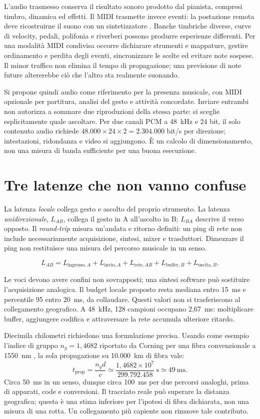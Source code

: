L'audio trasmesso conserva il risultato sonoro prodotto dal pianista,
compresi timbro, dinamica ed effetti. Il MIDI trasmette invece eventi:
la postazione remota deve ricostruirne il suono con un sintetizzatore
\cite{eng_midi}. Banche timbriche diverse, curve di velocity, pedali,
polifonia e riverberi possono produrre esperienze differenti. Per una
modalità MIDI condivisa occorre dichiarare strumenti e mappature,
gestire ordinamento e perdita degli eventi, sincronizzare le scelte
ed evitare note sospese. Il minor traffico non elimina il tempo di
propagazione; una previsione di note future altererebbe ciò che
l'altro sta realmente suonando.

Si propone quindi audio come riferimento per la presenza musicale,
con MIDI opzionale per partitura, analisi del gesto e attività
concordate. Inviare entrambi non autorizza a sommare due riproduzioni
della stessa parte: si sceglie esplicitamente quale ascoltare.
Per due canali PCM a 48~kHz e 24 bit, il solo contenuto audio richiede
$48.000\times24\times2=2.304.000$ bit/s per direzione; intestazioni,
ridondanza e video si aggiungono. È un calcolo di dimensionamento,
non una misura di banda sufficiente per una buona esecuzione.

\section{Tre latenze che non vanno confuse}

La latenza \emph{locale} collega gesto e ascolto del proprio strumento.
La latenza \emph{unidirezionale}, $L_{AB}$, collega il gesto in A
all'ascolto in B; $L_{BA}$ descrive il verso opposto. Il \emph{round-trip}
misura un'andata e ritorno definiti: un ping di rete non include
necessariamente acquisizione, sintesi, mixer e trasduttori. Dimezzare
il ping non restituisce una misura del percorso musicale in un senso.

\[
L_{AB}=L_{\mathrm{ingresso},A}+L_{\mathrm{invio},A}
+L_{\mathrm{rete},AB}+L_{\mathrm{buffer},B}
+L_{\mathrm{uscita},B}.
\]

Le voci devono avere confini non sovrapposti; una sintesi software
può sostituire l'acquisizione analogica. Il budget locale proposto
resta mediana entro 15~ms e percentile 95 entro 20~ms, da collaudare.
Questi valori non si trasferiscono al collegamento geografico.
A 48~kHz, 128 campioni occupano 2,67~ms: moltiplicare buffer,
aggiungere codifica e attraversare la rete accumula ulteriore ritardo.

Diecimila chilometri richiedono una formulazione precisa. Usando
come esempio l'indice di gruppo $n_g=1,4682$ riportato da Corning
per una fibra convenzionale a 1550~nm \cite{net_fiber}, la sola
propagazione su 10.000~km di fibra vale:
\[
t_{\mathrm{prop}}=\frac{n_g d}{c}
\simeq\frac{1,4682\times10^{7}}{299.792.458}\ \mathrm{s}
\simeq49\ \mathrm{ms}.
\]
Circa 50~ms in un senso, dunque circa 100~ms per due percorsi
analoghi, prima di apparati, code e conversioni. Il tracciato reale
può superare la distanza geografica; questa è una stima inferiore
per l'ipotesi di fibra dichiarata, non una misura di una rotta.
Un collegamento più capiente non rimuove tale contributo.


